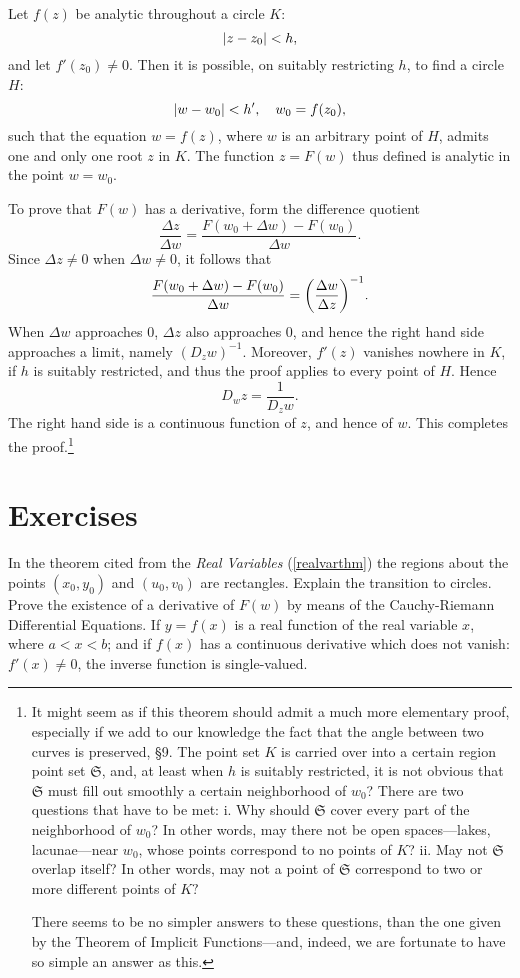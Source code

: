 \documentclass[twosided]{memoir}
\begin{document}
\begin{theorem}\label{realvarthm}
	Let $f(z)$ be analytic throughout a circle $K$:
	\[
	\abs*{z-z_0} <h
,\] and let $f'(z_0)\neq 0$. Then it is possible, on suitably restricting $h$, to find a circle $H$:
\[
	\abs*{w-w_0} <h', \quad w_0=f(z_0)
,\] such that the equation $w=f(z)$, where $w$ is an arbitrary point of $H$, admits one and only one root $z$ in $K$. The function $z=F(w)$ thus defined is analytic in the point $w=w_0$.
\end{theorem} 
To prove that $F(w)$ has a derivative, form the difference quotient
\[
	\frac{\Delta z}{\Delta w} =\frac{F(w_0+\Delta w)-F(w_0)}{\Delta w} 
.\] Since $\Delta z\neq 0$ when $\Delta w\neq 0$, it follows that
\[
	\frac{F(w_0+\Delta w)-F(w_0)}{\Delta w} =\pbr*{\frac{\Delta w}{\Delta z} } ^{-1}
.\] When $\Delta w$ approaches $0$, $\Delta z$ also approaches $0$, and hence the right hand side approaches a limit, namely $(D_zw)^{-1}$. Moreover, $f'(z)$ vanishes nowhere in $K$, if $h$ is suitably restricted, and thus the proof applies to every point of $H$. Hence
\[
D_wz=\frac{1}{D_zw}
.\] The right hand side is a continuous function of $z$, and hence of $w$. This completes the proof.\footnote{It might seem as if this theorem should admit a much more elementary proof, especially if we add to our knowledge the fact that the angle between two curves is preserved, \S 9. The point set $K$ is carried over into a certain region point set $\mathfrak{S}$, and, at least when $h$ is suitably restricted, it is not obvious that $\mathfrak{S}$ must fill out smoothly a certain neighborhood of $w_0$? There are two questions that have to be met: i. Why should $\mathfrak{S}$ cover every part of the neighborhood of $w_0$? In other words, may there not be open spaces---lakes, lacunae---near $w_0$, whose points correspond to no points of $K$? ii. May not $\mathfrak{S}$ overlap itself? In other words, may not a point of $\mathfrak{S}$ correspond to two or more different points of $K?$ 

There seems to be no simpler answers to these questions, than the one given by the Theorem of Implicit Functions---and, indeed, we are fortunate to have so simple an answer as this.}

\section*{Exercises}
\problem In the theorem cited from the \emph{Real Variables} (\ref{realvarthm}) the regions about the points $(x_0,y_0)$ and $(u_0,v_0)$ are rectangles. Explain the transition to circles.
\problem Prove the existence of a derivative of $F(w)$ by means of the Cauchy-Riemann Differential Equations. 
\problem If $y=f(x)$ is a real function of the real variable $x$, where $a<x<b$; and if $f(x)$ has a continuous derivative which does not vanish: $f'(x)\neq 0$, the inverse function is single-valued. 
\end{document}
